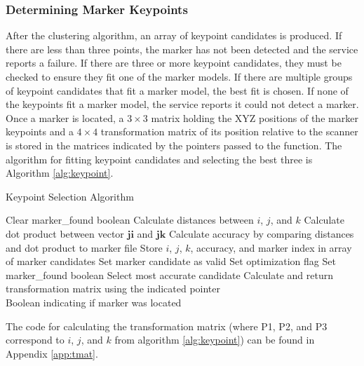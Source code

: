 \subsubsection{Determining Marker Keypoints}
After the clustering algorithm, an array of keypoint candidates is produced. If there are less than three points, the marker has not been detected and the service reports a failure. If there are three or more keypoint candidates, they must be checked to ensure they fit one of the marker models. If there are multiple groups of keypoint candidates that fit a marker model, the best fit is chosen. If none of the keypoints fit a marker model, the service reports it could not detect a marker. Once a marker is located, a $3\times3$ matrix holding the XYZ positions of the marker keypoints and a $4\times4$ transformation matrix of its position relative to the scanner is stored in the matrices indicated by the pointers passed to the function. The algorithm for fitting keypoint candidates and selecting the best three is Algorithm \ref{alg:keypoint}.
\begin{spacing}{0.8}
\begin{algorithm}[H]
\caption{Keypoint Selection Algorithm}
\label{alg:keypoint}
\begin{algorithmic}[1]
\begin{raggedright}
\State Clear marker\_found boolean
\State Calculate distances between $i$, $j$, and $k$
\State Calculate dot product between vector $\mathbf{ji}$ and $\mathbf{jk}$
\State Calculate accuracy by comparing distances and dot product to marker file
\EndFor
\State Store $i$, $j$, $k$, accuracy, and marker index in array of marker candidates
\State Set marker candidate as valid
\State Set optimization flag
\EndIf
\EndIf
\EndIf
\EndFor
\EndFor
\EndFor
{}
\State Set marker\_found boolean
\State Select most accurate candidate
\EndIf
\State Calculate and return transformation matrix using the indicated pointer \
\EndIf
\EndFunction\\
\Return Boolean indicating if marker was located
\end{raggedright}
\end{algorithmic}
\end{algorithm}
\end{spacing}
The code for calculating the transformation matrix (where P1, P2, and P3 correspond to $i$, $j$, and $k$ from algorithm \ref{alg:keypoint}) can be found in Appendix \ref{app:tmat}.\\
\clearpage
